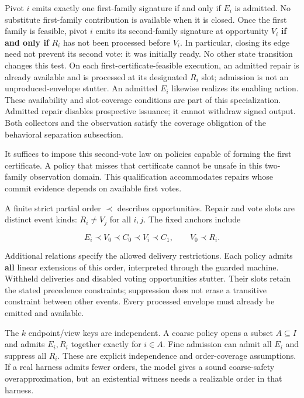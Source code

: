 Pivot \(i\) emits exactly one first-family signature if and only if
\(E_i\) is admitted. No substitute first-family contribution is
available when it is closed. Once the first family is feasible, pivot
\(i\) emits its second-family signature at opportunity \(V_i\)
\textbf{if and only if} \(R_i\) has not been processed before \(V_i\).
In particular, closing its edge need not prevent its second vote: it was
initially ready. No other state transition changes this test. On each
first-certificate-feasible execution, an admitted repair is already
available and is processed at its designated \(R_i\) slot; admission is
not an unproduced-envelope stutter. An admitted \(E_i\) likewise
realizes its enabling action. These availability and slot-coverage
conditions are part of this specialization. Admitted repair disables
prospective issuance; it cannot withdraw signed output. Both collectors
and the observation satisfy the coverage obligation of the behavioral
separation subsection.

It suffices to impose this second-vote law on policies capable of
forming the first certificate. A policy that misses that certificate
cannot be unsafe in this two-family observation domain. This
qualification accommodates repairs whose commit evidence depends on
available first votes.

A finite strict partial order \(\prec\) describes opportunities. Repair
and vote slots are distinct event kinds: \(R_i\ne V_j\) for all \(i,j\).
The fixed anchors include

\[
E_i\prec V_0\prec C_0\prec V_i\prec C_1,
\qquad V_0\prec R_i.
\]

Additional relations specify the allowed delivery restrictions. Each
policy admits \textbf{all} linear extensions of this order, interpreted
through the guarded machine. Withheld deliveries and disabled voting
opportunities stutter. Their slots retain the stated precedence
constraints; suppression does not erase a transitive constraint between
other events. Every processed envelope must already be emitted and
available.

The \(k\) endpoint/view keys are independent. A coarse policy opens a
subset \(A\subseteq I\) and admits \(E_i,R_i\) together exactly for
\(i\in A\). Fine admission can admit all \(E_i\) and suppress all
\(R_i\). These are explicit independence and order-coverage assumptions.
If a real harness admits fewer orders, the model gives a sound
coarse-safety overapproximation, but an existential witness needs a
realizable order in that harness.

